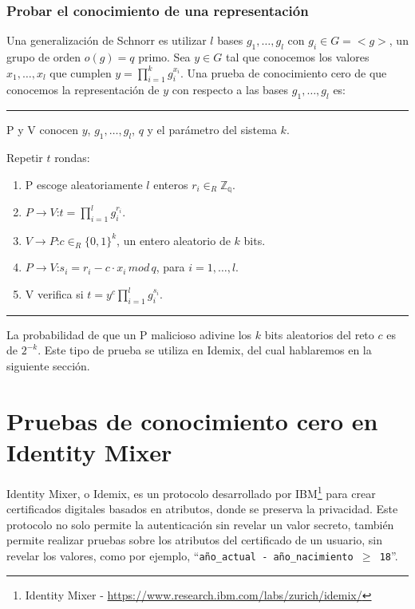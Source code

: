 \subsubsection{Probar el conocimiento de una representación}\label{reprKP}

Una generalización de Schnorr es utilizar $l$ bases $g_1, \dots, g_l$ con $g_i \in G = <g>$, un grupo de orden $o(g)=q$ primo. Sea $y\in G$ tal que conocemos los valores $x_1,\dots,x_l$ que cumplen $y = \prod_{i=1}^{k} g_i^{x_i}$. Una prueba de conocimiento cero de que conocemos la representación de $y$ con respecto a las bases $g_1, \dots, g_l$ es:


\rule{\textwidth}{1pt}
\begin{algorithm}
	P y V conocen $y$, $g_1, \dots, g_l$, $q$ y el parámetro del sistema $k$.
	
	\hfil
	
	Repetir $t$ rondas:
	\begin{enumerate}
		\item P escoge aleatoriamente $l$ enteros $r_i \in_R \mathbb{Z_q}$.
		\item $P \rightarrow V$:\quad $t=\prod_{i=1}^{l}g_i^{r_i}$.
		\item $V \rightarrow P$:\quad $c \in_R \{0,1\}^k$, un entero aleatorio de $k$ bits.
		\item $P \rightarrow V$:\quad $s_i = r_i - c\cdot x_i \, mod \, q$, para $i=1,\dots,l$.
		\item V verifica si \quad $t = y^c \prod_{i=1}^{l} g_i^{s_i}$.
	\end{enumerate}
	
\end{algorithm}
\rule{\textwidth}{1pt}

La probabilidad de que un P malicioso adivine los $k$ bits aleatorios del reto $c$ es de $2^{-k}$. Este tipo de prueba se utiliza en Idemix, del cual hablaremos en la siguiente sección.


%
%
%
%
%





\section{Pruebas de conocimiento cero en Identity Mixer}

Identity Mixer, o Idemix, es un protocolo desarrollado por IBM\footnote{Identity Mixer - \url{https://www.research.ibm.com/labs/zurich/idemix/}} para crear certificados digitales basados en atributos, donde se preserva la privacidad. Este protocolo no solo permite la autenticación sin revelar un valor secreto, también permite realizar pruebas sobre los atributos del certificado de un usuario, sin revelar los valores, como por ejemplo, ``\texttt{año\_actual - año\_nacimiento $\geq$ 18}''.

